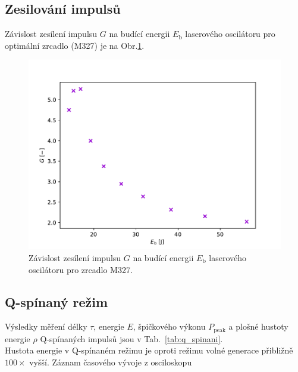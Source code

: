 \subsection{Zesilování impulsů}
Závislost zesílení impulsu $G$ na budící energii $E_\mathrm{b}$ laserového oscilátoru pro optimální zrcadlo (M327) je na Obr.\ref{fig:zasileni}.
\begin{figure}[H] 
	\centering
	\includegraphics[scale = 0.7]{img/zesileni.pdf} 
	\caption{Závislost zesílení impulsu $G$ na budící energii $E_\mathrm{b}$ laserového oscilátoru pro zrcadlo M327.} 
	\label{fig:zasileni}
\end{figure}

\subsection{Q-spínaný režim}
Výsledky měření délky $\tau$, energie $E$, špičkového výkonu $P_\mathrm{peak}$ a plošné hustoty energie $\rho$ Q-spínaných impulsů jsou v Tab.~\ref{tab:q_spinani}. \\
Hustota energie v Q-spínaném režimu je oproti režimu volné generace přibližně $100\times$ vyšší.
Záznam časového vývoje z osciloskopu

